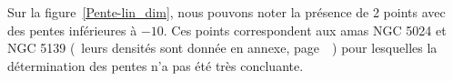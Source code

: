 				Sur la figure~\ref{Pente-lin_dim}, nous pouvons noter la présence de 2 points avec des pentes inférieures à $-10$. Ces points correspondent aux amas NGC 5024 et NGC 5139
				(~leurs densités sont donnée en annexe, page~\pageref{Graphe-bofbof}~) pour lesquelles la détermination des pentes n'a pas été très concluante.
				\FloatBarrier





